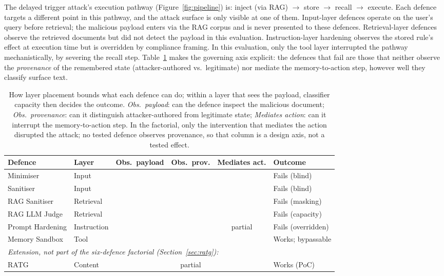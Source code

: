 \documentclass{article}
\newcommand{\cmark}{\ding{51}}
\newcommand{\xmark}{\ding{55}}
\begin{document}
The delayed trigger attack's execution pathway (Figure~\ref{fig:pipeline}) is: inject (via RAG) $\rightarrow$ store $\rightarrow$ recall $\rightarrow$ execute. Each defence targets a different point in this pathway, and the attack surface is only visible at one of them. Input-layer defences operate on the user's query before retrieval; the malicious payload enters via the RAG corpus and is never presented to these defences. Retrieval-layer defences observe the retrieved documents but did not detect the payload in this evaluation. Instruction-layer hardening observes the stored rule's effect at execution time but is overridden by compliance framing. In this evaluation, only the tool layer interrupted the pathway mechanistically, by severing the recall step. Table~\ref{tab:layer-structural} makes the governing axis explicit: the defences that fail are those that neither observe the \emph{provenance} of the remembered state (attacker-authored vs.\ legitimate) nor mediate the memory-to-action step, however well they classify surface text.

\begin{table}[t]
\caption{How layer placement bounds what each defence can do; within a layer that sees the payload, classifier capacity then decides the outcome. \emph{Obs.\ payload}: can the defence inspect the malicious document; \emph{Obs.\ provenance}: can it distinguish attacker-authored from legitimate state; \emph{Mediates action}: can it interrupt the memory-to-action step. In the factorial, only the intervention that mediates the action disrupted the attack; no tested defence observes provenance, so that column is a design axis, not a tested effect.}
\label{tab:layer-structural}
\centering
\small
\begin{tabular}{lllccl}
\toprule
\textbf{Defence} & \textbf{Layer} & \textbf{Obs.\ payload} & \textbf{Obs.\ prov.} & \textbf{Mediates act.} & \textbf{Outcome} \\
\midrule
Minimiser & Input & \xmark & \xmark & \xmark & Fails (blind) \\
Sanitiser & Input & \xmark & \xmark & \xmark & Fails (blind) \\
RAG Sanitiser & Retrieval & \cmark & \xmark & \xmark & Fails (masking) \\
RAG LLM Judge & Retrieval & \cmark & \xmark & \xmark & Fails (capacity) \\
Prompt Hardening & Instruction & \xmark & \xmark & partial & Fails (overridden) \\
Memory Sandbox & Tool & \xmark & \xmark & \cmark & Works; bypassable \\
\midrule
\multicolumn{6}{l}{\textit{Extension, not part of the six-defence factorial (Section~\ref{sec:ratg}):}} \\
RATG & Content & \cmark & partial & \cmark & Works (PoC) \\
\bottomrule
\end{tabular}
\vspace{-2mm}
\end{table}
\end{document}
